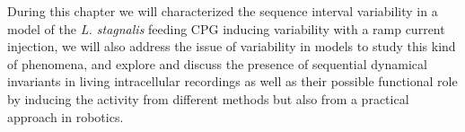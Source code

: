 During this chapter we will characterized the sequence interval variability in a model of the \textit{L. stagnalis} feeding CPG inducing variability with a ramp current injection, we will also address the issue of variability in models to study this kind of phenomena, and explore and discuss the presence of sequential dynamical invariants in living intracellular recordings as well as their possible functional role by inducing the activity from different methods but also from a practical approach in robotics. 


